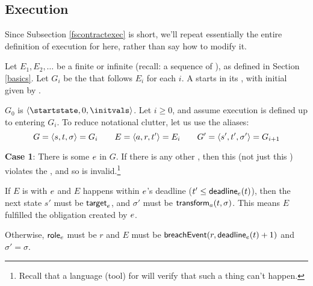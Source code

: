\documentclass[12pt]{article}
\begin{document}
\subsection{Execution} \label{gvarsexecution}

Since Subsection \ref{fscontractexec} is short, we'll repeat essentially the entire definition of execution for \FSContracts here, rather than say how to modify it.

\medskip

Let $E_1, E_2, \dots$ be a finite or infinite \trace (recall: a sequence of \Events), as defined in Section \ref{basics}. Let $G_i$ be the \GlobalState that follows $E_i$ for each $i$. A \Contract starts in its \startstate, with initial \gvarsassign given by \initvals.

$G_0$ is $\tup{\startstate, 0, \initvals}$.
Let $i \geq 0$, and assume execution is defined up to entering $G_i$. To reduce notational clutter, let us use the aliases:
\[ G = \langle s,t,\sigma\rangle = G_i  \qquad E = \langle a,r,t'\rangle =  E_i \qquad  G' = \langle s',t', \sigma'\rangle = G_{i+1}\]

{\bf Case 1}: There is some \enabled \mustntran $e$ in $G$. If there is any other \enabled \transition, then this \Contract (not just this \trace) violates the \uaocz, and so is invalid.\footnote{Recall that a language (tool) for \Contracts will verify that such a thing can't happen.}
\begin{PPI}
    \item If $E$ is \compatible with $e$ and $E$ happens within $e$'s deadline ($t' \leq \textsf{deadline}_{e}(t)$), then the next state $s'$ must be $\textsf{target}_{e}$, and $\sigma'$ must be $\textsf{transform}_{a}(t,\sigma)$. This means $E$ fulfilled the obligation created by $e$.
    \item Otherwise, $\textsf{role}_{e}$ must be $r$ and $E$ must be $\textsf{breachEvent}(r,\textsf{deadline}_{e}(t) + 1)$ and $\sigma' = \sigma$. %
\end{PPI}
\end{document}
